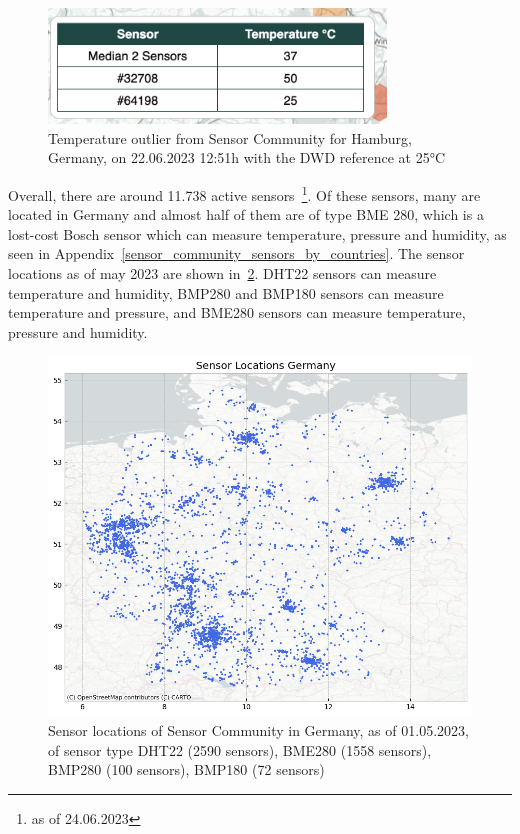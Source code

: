 \begin{figure}[ht]
    \centering
    \includegraphics[width=0.8\textwidth]{images/sensor_community_outliers.png}
    \caption{Temperature outlier from Sensor Community for Hamburg, Germany, on 22.06.2023 12:51h with the DWD reference at 25°C}
    \label{fig:temperature_sensor_community_outlier}
\end{figure}

Overall, there are around 11.738 active sensors~\footnote{as of 24.06.2023}. Of these sensors, many are located in Germany and almost half of them are of type BME 280, which is a lost-cost Bosch sensor which can measure temperature, pressure and humidity, as seen in Appendix~\ref{sensor_community_sensors_by_countries}. The sensor locations as of may 2023 are shown in~\ref{fig:sensor community sensor locations germany}. DHT22 sensors can measure temperature and humidity, BMP280 and BMP180 sensors can measure temperature and pressure, and BME280 sensors can measure temperature, pressure and humidity.\\

\begin{figure}[ht]
    \centering
    \includegraphics[width=1\textwidth]{images/sc_sensor_locations_germany.png}
    \caption{Sensor locations of Sensor Community in Germany, as of 01.05.2023, of sensor type DHT22 (2590 sensors), BME280 (1558 sensors), BMP280 (100 sensors), BMP180 (72 sensors)}
    \label{fig:sensor community sensor locations germany}
\end{figure}

